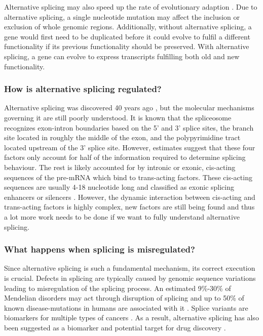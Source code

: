 Alternative splicing may also speed up the rate of evolutionary adaption \cite{whygenesinpieces} \cite{whyrevisited}. Due to alternative splicing, a single nucleotide mutation may affect the inclusion or exclusion of whole genomic regions. Additionally, without alternative splicing, a gene would first need to be duplicated before it could evolve to fulfil a different functionality if its previous functionality should be preserved. With alternative splicing, a gene can evolve to express transcripts fulfilling both old and new functionality. 


\subsubsection{How is alternative splicing regulated?}
Alternative splicing was discovered 40 years ago \cite{discoveryofsplicing}, but the molecular mechanisms governing it are still poorly understood. It is known that the spliceosome recognizes exon-intron boundaries based on the 5' and 3' splice sites, the branch site located in roughly the middle of the exon, and the polypyrimidine tract located upstream of the 3' splice site. However, estimates suggest that these four factors only account for half of the information required to determine splicing behaviour. The rest is likely accounted for by intronic or exonic, cis-acting sequences of the pre-mRNA which bind to trans-acting factors. These cis-acting sequences are usually 4-18 nucleotide long and classified as exonic splicing enhancers or silencers \cite{splicing_current_perspectives}.
However, the dynamic interaction between cis-acting and trans-acting factors is highly complex, new factors are still being found and thus a lot more work needs to be done if we want to fully understand alternative splicing.

\subsubsection{What happens when splicing is misregulated?}
Since alternative splicing is such a fundamental mechanism, its correct execution is crucial. Defects in splicing are typically caused by genomic sequence variations leading to misregulation of the splicing process. An estimated 9\%-30\% of Mendelian disorders may act through disruption of splicing \cite{comparison} and up to 50\% of known disease-mutations in humans are associated with it \cite{50diseasessplicing}. 
Splice variants are biomarkers for multiple types of cancers \cite{cancer} \cite{splicingcausescancer}. As a result, alternative splicing has also been suggested as a biomarker and potential target for drug discovery \cite{drugdiscoverysplicing}. \\

